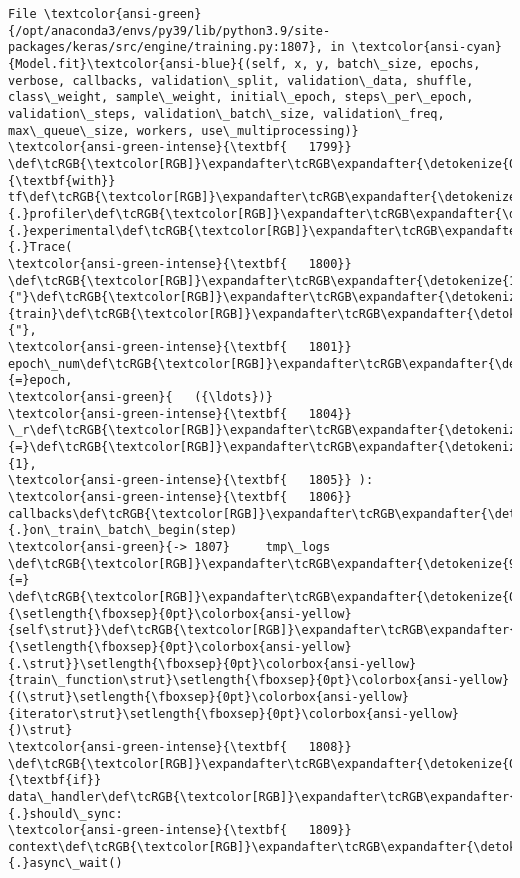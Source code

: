 \documentclass[11pt]{article}
\begin{document}
\begin{Verbatim}[commandchars=\\\{\}, frame=single, framerule=2mm, rulecolor=\color{outerrorbackground}]
File \textcolor{ansi-green}{/opt/anaconda3/envs/py39/lib/python3.9/site-packages/keras/src/engine/training.py:1807}, in \textcolor{ansi-cyan}{Model.fit}\textcolor{ansi-blue}{(self, x, y, batch\_size, epochs, verbose, callbacks, validation\_split, validation\_data, shuffle, class\_weight, sample\_weight, initial\_epoch, steps\_per\_epoch, validation\_steps, validation\_batch\_size, validation\_freq, max\_queue\_size, workers, use\_multiprocessing)}
\textcolor{ansi-green-intense}{\textbf{   1799}} \def\tcRGB{\textcolor[RGB]}\expandafter\tcRGB\expandafter{\detokenize{0,135,0}}{\textbf{with}} tf\def\tcRGB{\textcolor[RGB]}\expandafter\tcRGB\expandafter{\detokenize{98,98,98}}{.}profiler\def\tcRGB{\textcolor[RGB]}\expandafter\tcRGB\expandafter{\detokenize{98,98,98}}{.}experimental\def\tcRGB{\textcolor[RGB]}\expandafter\tcRGB\expandafter{\detokenize{98,98,98}}{.}Trace(
\textcolor{ansi-green-intense}{\textbf{   1800}}     \def\tcRGB{\textcolor[RGB]}\expandafter\tcRGB\expandafter{\detokenize{175,0,0}}{"}\def\tcRGB{\textcolor[RGB]}\expandafter\tcRGB\expandafter{\detokenize{175,0,0}}{train}\def\tcRGB{\textcolor[RGB]}\expandafter\tcRGB\expandafter{\detokenize{175,0,0}}{"},
\textcolor{ansi-green-intense}{\textbf{   1801}}     epoch\_num\def\tcRGB{\textcolor[RGB]}\expandafter\tcRGB\expandafter{\detokenize{98,98,98}}{=}epoch,
\textcolor{ansi-green}{   ({\ldots})}
\textcolor{ansi-green-intense}{\textbf{   1804}}     \_r\def\tcRGB{\textcolor[RGB]}\expandafter\tcRGB\expandafter{\detokenize{98,98,98}}{=}\def\tcRGB{\textcolor[RGB]}\expandafter\tcRGB\expandafter{\detokenize{98,98,98}}{1},
\textcolor{ansi-green-intense}{\textbf{   1805}} ):
\textcolor{ansi-green-intense}{\textbf{   1806}}     callbacks\def\tcRGB{\textcolor[RGB]}\expandafter\tcRGB\expandafter{\detokenize{98,98,98}}{.}on\_train\_batch\_begin(step)
\textcolor{ansi-green}{-> 1807}     tmp\_logs \def\tcRGB{\textcolor[RGB]}\expandafter\tcRGB\expandafter{\detokenize{98,98,98}}{=} \def\tcRGB{\textcolor[RGB]}\expandafter\tcRGB\expandafter{\detokenize{0,135,0}}{\setlength{\fboxsep}{0pt}\colorbox{ansi-yellow}{self\strut}}\def\tcRGB{\textcolor[RGB]}\expandafter\tcRGB\expandafter{\detokenize{98,98,98}}{\setlength{\fboxsep}{0pt}\colorbox{ansi-yellow}{.\strut}}\setlength{\fboxsep}{0pt}\colorbox{ansi-yellow}{train\_function\strut}\setlength{\fboxsep}{0pt}\colorbox{ansi-yellow}{(\strut}\setlength{\fboxsep}{0pt}\colorbox{ansi-yellow}{iterator\strut}\setlength{\fboxsep}{0pt}\colorbox{ansi-yellow}{)\strut}
\textcolor{ansi-green-intense}{\textbf{   1808}}     \def\tcRGB{\textcolor[RGB]}\expandafter\tcRGB\expandafter{\detokenize{0,135,0}}{\textbf{if}} data\_handler\def\tcRGB{\textcolor[RGB]}\expandafter\tcRGB\expandafter{\detokenize{98,98,98}}{.}should\_sync:
\textcolor{ansi-green-intense}{\textbf{   1809}}         context\def\tcRGB{\textcolor[RGB]}\expandafter\tcRGB\expandafter{\detokenize{98,98,98}}{.}async\_wait()


\end{Verbatim}
\end{document}

